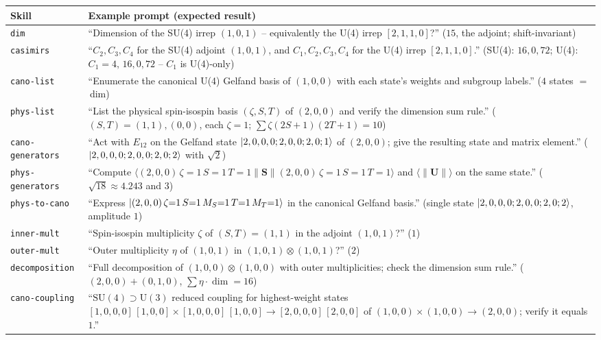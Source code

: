 \documentclass[aps,onecolumn,10pt,superscriptaddress,floatfix,nofootinbib]{revtex4}
\begin{document}
\begin{table}[tp]
    \centering
    \small
    \begin{tabular}{p{3.1cm}p{13.2cm}}
    \hline\hline
    Skill & Example prompt (expected result) \\
    \hline
    \verb|dim| & ``Dimension of the SU(4) irrep $(1,0,1)$ -- equivalently the U(4) irrep $[2,1,1,0]$?'' ($15$, the adjoint; shift-invariant) \\
    \verb|casimirs| & ``$C_2,C_3,C_4$ for the SU(4) adjoint $(1,0,1)$, and $C_1,C_2,C_3,C_4$ for the U(4) irrep $[2,1,1,0]$.'' (SU(4): $16,0,72$; U(4): $C_1{=}4,\,16,0,72$ -- $C_1$ is U(4)-only) \\
    \verb|cano-list| & ``Enumerate the canonical U(4) Gelfand basis of $(1,0,0)$ with each state's weights and subgroup labels.'' ($4$ states $={}$\,dim) \\
    \verb|phys-list| & ``List the physical spin-isospin basis $(\zeta,S,T)$ of $(2,0,0)$ and verify the dimension sum rule.'' ($(S,T){=}(1,1),(0,0)$, each $\zeta{=}1$; $\sum\zeta(2S{+}1)(2T{+}1){=}10$) \\
    \verb|cano-generators| & ``Act with $E_{12}$ on the Gelfand state $\ket{2,0,0,0;2,0,0;2,0;1}$ of $(2,0,0)$; give the resulting state and matrix element.'' ($\ket{2,0,0,0;2,0,0;2,0;2}$ with $\sqrt2$) \\
    \verb|phys-generators| & ``Compute $\langle(2,0,0)\,\zeta{=}1\,S{=}1\,T{=}1\|\mathbf{S}\|(2,0,0)\,\zeta{=}1\,S{=}1\,T{=}1\rangle$ and $\langle\|\mathbf{U}\|\rangle$ on the same state.'' ($\sqrt{18}\approx4.243$ and $3$) \\
    \verb|phys-to-cano| & ``Express $\ket{(2,0,0)\,\zeta{=}1\,S{=}1\,M_S{=}1\,T{=}1\,M_T{=}1}$ in the canonical Gelfand basis.'' (single state $\ket{2,0,0,0;2,0,0;2,0;2}$, amplitude $1$) \\
    \verb|inner-mult| & ``Spin-isospin multiplicity $\zeta$ of $(S,T){=}(1,1)$ in the adjoint $(1,0,1)$?'' ($1$) \\
    \verb|outer-mult| & ``Outer multiplicity $\eta$ of $(1,0,1)$ in $(1,0,1)\otimes(1,0,1)$?'' ($2$) \\
    \verb|decomposition| & ``Full decomposition of $(1,0,0)\otimes(1,0,0)$ with outer multiplicities; check the dimension sum rule.'' ($(2,0,0){+}(0,1,0)$, $\sum\eta\cdot\dim{=}16$) \\
    \verb|cano-coupling| & ``$\mathrm{SU(4)}{\supset}\mathrm{U(3)}$ reduced coupling for highest-weight states $[1,0,0,0]\,[1,0,0]\times[1,0,0,0]\,[1,0,0]\to[2,0,0,0]\,[2,0,0]$ of $(1,0,0)\times(1,0,0)\to(2,0,0)$; verify it equals $1$.'' \\

\end{tabular}
\end{table}
\end{document}
